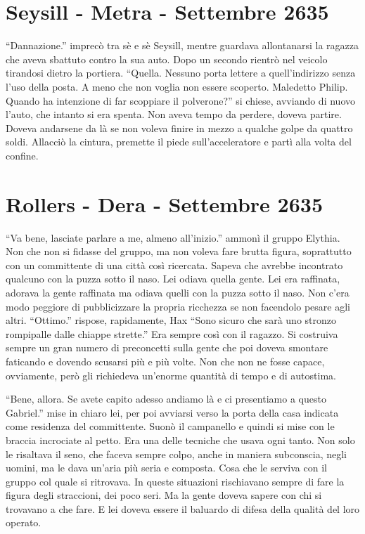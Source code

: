   \section{Seysill - Metra - Settembre 2635}
    
    ``Dannazione.'' imprecò tra sè e sè Seysill, mentre guardava
    allontanarsi la ragazza che aveva sbattuto contro la sua auto. Dopo un
    secondo rientrò nel veicolo tirandosi dietro la portiera. ``Quella.
    Nessuno porta lettere a quell'indirizzo senza l'uso della posta. A meno
    che non voglia non essere scoperto. Maledetto Philip. Quando ha
    intenzione di far scoppiare il polverone?'' si chiese, avviando di
    nuovo l'auto, che intanto si era spenta. Non aveva tempo da perdere,
    doveva partire. Doveva andarsene da là se non voleva finire in mezzo a
    qualche golpe da quattro soldi. Allacciò la cintura, premette il piede
    sull'acceleratore e partì alla volta del confine.

  \section{Rollers - Dera - Settembre 2635}

    ``Va bene, lasciate parlare a me, almeno all'inizio.'' ammonì il gruppo
    Elythia. Non che non si fidasse del gruppo, ma non voleva fare brutta
    figura, soprattutto con un committente di una città così ricercata.
    Sapeva che avrebbe incontrato qualcuno con la puzza sotto il naso. Lei
    odiava quella gente. Lei era raffinata, adorava la gente raffinata ma
    odiava quelli con la puzza sotto il naso. Non c'era modo peggiore di
    pubblicizzare la propria ricchezza se non facendolo pesare agli altri.
    ``Ottimo.'' rispose, rapidamente, Hax ``Sono sicuro che sarà uno
    stronzo rompipalle dalle chiappe strette.'' Era sempre così con il
    ragazzo. Si costruiva sempre un gran numero di preconcetti sulla gente
    che poi doveva smontare faticando e dovendo scusarsi più e più volte.
    Non che non ne fosse capace, ovviamente, però gli richiedeva un'enorme
    quantità di tempo e di autostima.

    ``Bene, allora. Se avete capito adesso andiamo là e ci presentiamo a
    questo Gabriel.'' mise in chiaro lei, per poi avviarsi verso la porta
    della casa indicata come residenza del committente. Suonò il campanello
    e quindi si mise con le braccia incrociate al petto. Era una delle
    tecniche che usava ogni tanto. Non solo le risaltava il seno, che
    faceva sempre colpo, anche in maniera subconscia, negli uomini, ma le
    dava un'aria più seria e composta. Cosa che le serviva con il gruppo
    col quale si ritrovava. In queste situazioni rischiavano sempre di fare
    la figura degli straccioni, dei poco seri. Ma la gente doveva sapere
    con chi si trovavano a che fare. E lei doveva essere il baluardo di
    difesa della qualità del loro operato.


